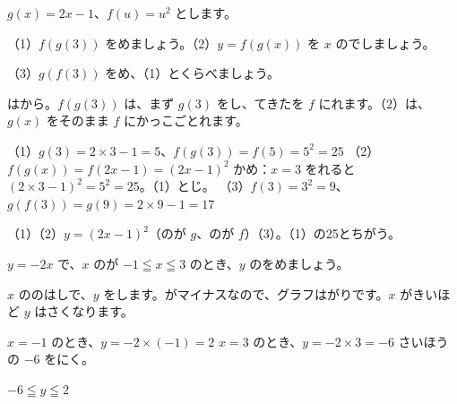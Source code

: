 \begin{reidai}[\R{箱}{はこ}をつなぐ：\R{合成}{ごう|せい}\R{関数}{かん|すう}]
$g(x)=2x-1$、$f(u)=u^2$ とします。\par
（1）$f(g(3))$ をめましょう。\quad（2）$y=f(g(x))$ を $x$ のでしましょう。\par
（3）$g(f(3))$ をめ、（1）とくらべましょう。\par
\kangaekata {}はから。$f(g(3))$ は、まず $g(3)$ をし、てきたを $f$ にれます。（2）は、$g(x)$ をそのまま $f$ にかっこごとれます。\par
\bkthrdSi（1）\nobreak $g(3)=2\times3-1=5$、$f(g(3))=f(5)=5^2=25$
\bkthrdI（2）\nobreak $f(g(x))=f(2x-1)=(2x-1)^2$
\bkthrdJ {}かめ：$x=3$ をれると $(2\times3-1)^2=5^2=25$。（1）とじ。
\bkthrdI（3）\nobreak $f(3)=3^2=9$、$g(f(3))=g(9)=2\times9-1=17$\par
\bkthrdK（1）\quad（2）\nobreak $y=(2x-1)^2$（のが $g$、のが $f$）\quad（3）。（1）の25とちがう。
\end{reidai}

\begin{reidai}
$y=-2x$ で、$x$ のが $-1\leqq x\leqq3$ のとき、$y$ のをめましょう。\par
\kangaekata $x$ ののはしで、$y$ をします。がマイナスなので、グラフはがりです。$x$ がきいほど $y$ はさくなります。\par
\noindent\begin{minipage}[c]{0.6\linewidth}
\bkthrdS $x=-1$ のとき、$y=-2\times(-1)=2$
\bkthrdC $x=3$ のとき、$y=-2\times3=-6$
\bkthrdC {}さいほうの $-6$ をにく。\par
\bkthrdK $-6\leqq y\leqq2$
\end{minipage}\hfill
\begin{minipage}[c]{0.36\linewidth}\centering
{}
\end{minipage}
\end{reidai}

